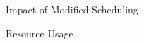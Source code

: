 \documentclass[notes xcolor=dvipsnames]{beamer}
\begin{document}
    \begin{frame}{Impact of Modified Scheduling}

        \begin{figure}
        \end{figure}

        \begin{figure}
        \end{figure}

        
    \end{frame}

    \begin{frame}{Resource Usage}
        \begin{figure}
        \end{figure}
        
    \end{frame}
\end{document}
